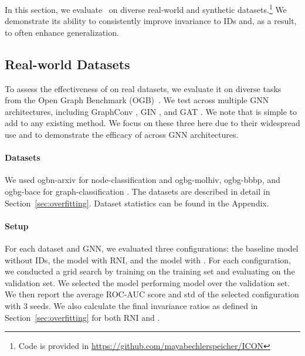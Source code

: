


In this section, we evaluate \ourmethod~on diverse real-world  and synthetic datasets.\footnote{Code is provided in \url{https://github.com/mayabechlerspeicher/ICON}} We demonstrate its ability to consistently improve invariance to IDs and, as a result, to often enhance generalization.

\subsection{Real-world Datasets}\label{subsec:real_data}
To assess the effectiveness of {\ourmethod} on real datasets, we evaluate it on diverse tasks from the Open Graph Benchmark (OGB)~\cite{hu2021opengraphbenchmarkdatasets}. We test {\ourmethod} across multiple GNN architectures, including GraphConv \cite{morris2021weisfeiler}, GIN \cite{gin}, and GAT \cite{gat}.  We note that {\ourmethod} is simple to add to any existing method. We focus on these three here due to their widespread use and to demonstrate the efficacy of {\ourmethod} across GNN architectures.


\paragraph{Datasets} We used ogbn-arxiv for node-classification and ogbg-molhiv, ogbg-bbbp, and ogbg-bace for graph-classification \cite{ogb}. The datasets are described in detail in Section~\ref{sec:overfitting}. Dataset statistics can be found in the Appendix.


\paragraph{Setup}
For each dataset and GNN, we evaluated three configurations: the baseline model without IDs, the model with RNI, and the model with \ourmethod. 
For each configuration,  we conducted a grid search by training on the training set and evaluating on the validation set. We selected the model performing model over the validation set. We then report the average ROC-AUC score and std of the selected configuration with $3$ seeds.
We also calculate the final invariance ratios as defined in Section~\ref{sec:overfitting} for both RNI and \ourmethod.




